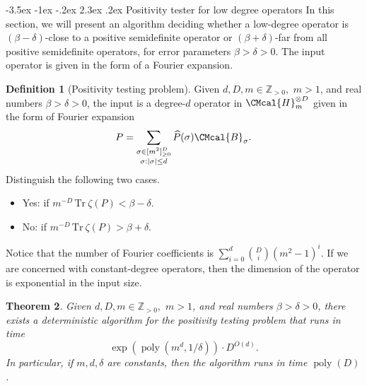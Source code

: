 \documentclass[11pt]{article}
\makeatletter
\renewcommand{\section}{\@startsection {section}{1}{\z@}%
             {-3.5ex \@plus -1ex \@minus -.2ex}%
             {2.3ex \@plus .2ex}%
             {\normalfont\Large\scshape\bfseries}}
\def\B{\CMcal{B}}
\def\H{\CMcal{H}}
\theoremstyle{plain}
\newtheorem{theorem}{Theorem}[section]
\theoremstyle{definition}
\newtheorem{definition}[theorem]{Definition}
\newcommand {\br} [1] {\ensuremath{ \left( #1 \right) }}
\DeclarePairedDelimiter{\abs}{\lvert}{\rvert}
\newcommand {\Tr} {\ensuremath{ \mathrm{Tr} }}
\newcommand{\posint}{{\mathbb Z}_{>0}}
\newcommand{\herspace}[1]{\ensuremath{\H_m^{\otimes #1}}}
\newcommand{\poly} {\ensuremath{\operatorname{poly}}}
\newcommand{\dlbo} {\ensuremath{{D}}}
\newcommand{\1}{\mathbb{1}} %
\makeatother
\begin{document}
%
\section{Positivity tester for low degree operators}\label{sec:positivitytesting}
In this section, we will present an algorithm deciding whether a low-degree operator is $\br{\beta-\delta}$-close to a positive semidefinite operator or $\br{\beta+\delta}$-far from all positive semidefinite operators,
for error parameters $\beta>\delta>0$.
The input operator is given in the form of a Fourier expansion. 
\begin{definition}[Positivity testing problem]\label{def:postest}
Given $d, \dlbo, m\in\posint,$ $m>1$, and real numbers $\beta>\delta> 0$, the input is a degree-$d$ operator in $\herspace{\dlbo}$ given in the form of Fourier expansion
$$P=\sum_{\substack{\sigma\in[m^2]_{\ge 0}^\dlbo\\\sigma: \abs{\sigma}\le d}}\widehat{P}(\sigma)\B_\sigma.$$
Distinguish the following two cases.
\begin{itemize}
    \item Yes: if $m^{-\dlbo}\,\Tr~\zeta(P)<\beta-\delta$.
    \item No: if $m^{-\dlbo}\,\Tr~\zeta(P)>\beta+\delta$.
\end{itemize}
\end{definition}
Notice that the number of Fourier coefficients is $\sum_{i=0}^d{\binom{\dlbo}{i} }\br{m^2-1}^i$. If we are concerned with constant-degree operators, then the dimension of the operator is exponential in the input size.




\begin{theorem}\label{thm:psd-test}
  Given $d, \dlbo, m\in\posint,$ $m>1$, and real numbers $\beta>\delta> 0$,
there exists a deterministic algorithm for the positivity testing problem that runs in time
  $$\exp\br{\poly\br{m^d, 1/\delta}}\cdot \dlbo^{O(d)}.$$
  In particular, if $m,d,\delta$ are constants, then the algorithm runs in time $\poly(\dlbo)$.
\end{theorem}
\end{document}
